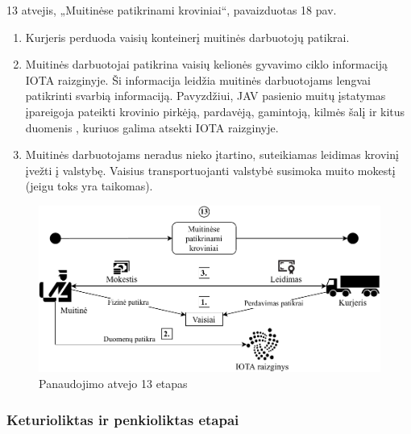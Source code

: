 13 atvejis, „Muitinėse patikrinami kroviniai“, pavaizduotas 18 pav.
\begin{enumerate}
    \item Kurjeris perduoda vaisių konteinerį muitinės darbuotojų patikrai.
    \item Muitinės darbuotojai patikrina vaisių kelionės gyvavimo ciklo informaciją IOTA raizginyje. Ši informacija leidžia muitinės darbuotojams lengvai patikrinti svarbią informaciją. Pavyzdžiui, JAV pasienio muitų įstatymas įpareigoja pateikti krovinio pirkėją, pardavėją, gamintoją, kilmės šalį ir kitus duomenis \cite{customs2018importer}, kuriuos galima atsekti IOTA raizginyje. 
    \item Muitinės darbuotojams neradus nieko įtartino, suteikiamas leidimas krovinį įvežti į valstybę. Vaisius transportuojanti valstybė susimoka muito mokestį (jeigu toks yra taikomas).
\end{enumerate}

\begin{figure}[H]
    \centering
    \includegraphics[scale=0.7]{images/iota-usecase-13}
    \caption{Panaudojimo atvejo 13 etapas}
\end{figure}




\subsubsection{Keturioliktas ir penkioliktas etapai}

